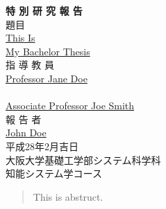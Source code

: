 \documentclass[a4j,12pt,oneside,openany,english,dvipdfmx]{jsbook}
\begin{document}
\thispagestyle{empty}
\begin{center}
\vspace*{5mm}
{\Huge {\bf 特 \hspace{12pt} 別 \hspace{12pt} 研 \hspace{12pt} 究 \hspace{12pt} 報 \hspace{12pt} 告}}\\
\vspace{2cm}
{\Large 題\hspace{8mm}目}\\
\vspace{1cm}
\underline{\LARGE{This Is}} \\
\vspace{0.5cm}
\underline{\LARGE{My Bachelor Thesis}} \\
\vspace{12mm}
{\large 指 導 教 員}\\
\vspace{6mm}
\underline{\Large Professor Jane Doe}\\
　\\
\underline{\Large Associate Professor Joe Smith}\\
\vspace{8mm}
{\large 報 告 者}\\
\vspace{6mm}
\underline{\Large John Doe}\\
\vspace{10mm}
{\Large 平成28年2月吉日}\\
\vspace{14mm}
{\Large 大阪大学基礎工学部システム科学科\\知能システム学コース}\\
\end{center}
\clearpage
\setcounter{page}{0}

\begin{abstract}
  This is abstruct.
\end{abstract}


\clearpage
\tableofcontents
\clearpage
\setcounter{page}{0}

\end{document}
